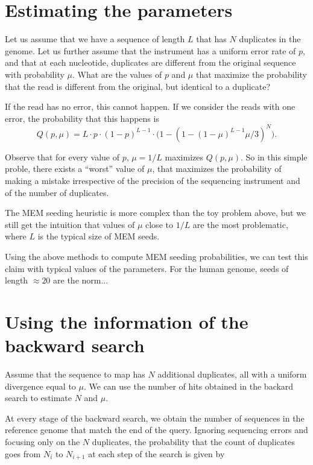 \documentclass{article}
\begin{document}
\section{Estimating the parameters}

Let us assume that we have a sequence of length $L$ that has $N$
duplicates in the genome. Let us further assume that the instrument has a
uniform error rate of $p$, and that at each nucleotide, duplicates are
different from the original sequence with probability $\mu$. What are the
values of $p$ and $\mu$ that maximize the probability that the read is
different from the original, but identical to a duplicate?

If the read has no error, this cannot happen. If we consider the reads
with one error, the probability that this happens is
\begin{equation}
Q(p,\mu) = L \cdot p \cdot (1-p)^{L-1}
\cdot \Big( 1- (1-(1-\mu)^{L-1} \mu/3)^N \Big).
\end{equation}

Observe that for every value of $p$, $\mu = 1/L$ maximizes $Q(p,\mu)$. So
in this simple proble, there exists a ``worst'' value of $\mu$, that
maximizes the probability of making a mistake irrespective of the
precision of the sequencing instrument and of the number of duplicates.

The MEM seeding heuristic is more complex than the toy problem above, but
we still get the intuition that values of $\mu$ close to $1/L$ are the
most problematic, where $L$ is the typical size of MEM seeds.

Using the above methods to compute MEM seeding probabilities, we can test
this claim with typical values of the parameters. For the human genome,
seeds of length $\approx 20$ are the norm...

\section{Using the information of the backward search}

Assume that the sequence to map has $N$ additional duplicates, all with a
uniform divergence equal to $\mu$. We can use the number of hits
obtained in the backard search to estimate $N$ and $\mu$.

At every stage of the backward search, we obtain the number of sequences
in the reference genome that match the end of the query. Ignoring
sequencing errors and focusing only on the $N$ duplicates, the probability
that the count of duplicates goes from $N_i$ to $N_{i+1}$ at each step of
the search is given by
\end{document}
